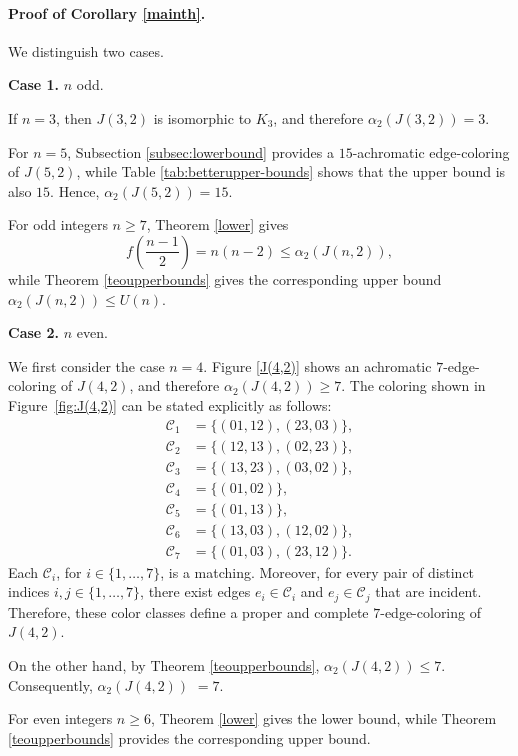 \documentclass{article}
\begin{document}
\paragraph{Proof of Corollary \ref{mainth}.}

We distinguish two cases.

\smallskip

\noindent
\textbf{Case 1.} $n$ odd.

If $n=3$, then $J(3,2)$ is isomorphic to $K_3$, and therefore
$\alpha_2(J(3,2))=3$.

For $n=5$, Subsection \ref{subsec:lowerbound} provides a $15$-achromatic
edge-coloring of $J(5,2)$, while Table \ref{tab:betterupper-bounds} shows that
the upper bound is also $15$. Hence,
$\alpha_2(J(5,2))=15$.

For odd integers $n\ge7$, Theorem \ref{lower} gives
$$
f\!\left(\frac{n-1}{2}\right)=n(n-2)\le \alpha_2(J(n,2)),
$$
while Theorem \ref{teoupperbounds} gives the corresponding upper bound
$\alpha_2(J(n,2))\le U(n)$.

\smallskip

\noindent
\textbf{Case 2.}  $n$ even.

We first consider the case $n=4$. Figure \ref{J(4,2)} shows an achromatic
$7$-edge-coloring of $J(4,2)$, and therefore
$\alpha_2(J(4,2))\ge7$. 
The coloring shown in Figure~\ref{fig:J(4,2)} can be stated explicitly as follows:
$$
\begin{aligned}
\mathcal{C}_1 &= \{(01,12),(23,03)\},\\
\mathcal{C}_2 &= \{(12,13),(02,23)\},\\
\mathcal{C}_3 &= \{(13,23),(03,02)\},\\
\mathcal{C}_4 &= \{(01,02)\},\\
\mathcal{C}_5 &= \{(01,13)\},\\
\mathcal{C}_6 &= \{(13,03),(12,02)\},\\
\mathcal{C}_7 &= \{(01,03),(23,12)\}.
\end{aligned}
$$
Each $\mathcal{C}_i$, for $i\in\{1,\ldots,7\}$, is a matching.
Moreover, for every pair of distinct indices $i,j\in\{1,\ldots,7\}$,
there exist edges $e_i\in\mathcal{C}_i$ and
$e_j\in\mathcal{C}_j$ that are incident. Therefore, these color
classes define a proper and complete $7$-edge-coloring of $J(4,2)$.

On the other hand, by
Theorem \ref{teoupperbounds},
$\alpha_2(J(4,2))\le7$. Consequently,
$\alpha_2(J(4,2))$ $=7$.

For even integers $n\ge6$, Theorem \ref{lower} gives the lower bound,
while Theorem \ref{teoupperbounds} provides the corresponding upper bound.
\end{document}
